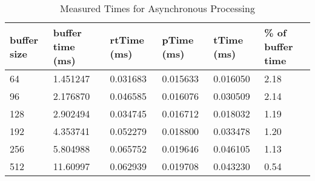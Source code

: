\begin{table}[H]
\begin{center}
\begin{tabular}{ |p{1.4cm}||p{1.5cm}|p{1.7cm}|p{1.7cm}|p{1.6cm}|p{1.4cm}|  }
 \hline
 buffer size    &  buffer time (ms)    & rtTime (ms)   & pTime (ms)    & tTime (ms) & \% of buffer time\\
 \hline
 64             & 1.451247      & 0.031683          & 0.015633          & 0.016050      & 2.18 \\
 96             & 2.176870      & 0.046585          & 0.016076          & 0.030509      & 2.14 \\
 128            & 2.902494      & 0.034745          & 0.016712          & 0.018032      & 1.19 \\
 192            & 4.353741      & 0.052279          & 0.018800          & 0.033478      & 1.20 \\
 256            & 5.804988      & 0.065752          & 0.019646          & 0.046105      & 1.13 \\
 512            & 11.60997      & 0.062939          & 0.019708          & 0.043230      & 0.54 \\
 \hline
\end{tabular}
\end{center}
\caption{Measured Times for Asynchronous Processing}
\label{tab:latency_async}
\end{table}

